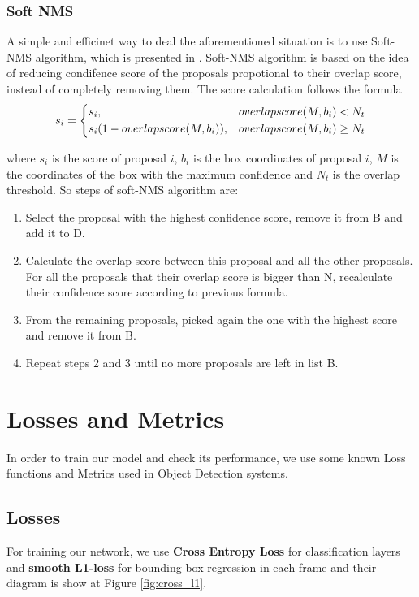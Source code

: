 \subsubsection{Soft NMS}
A simple and efficinet way to deal the aforementioned situation is to use Soft-NMS algorithm, which is presented in \cite{DBLP:journals/corr/BodlaSCD17}.
Soft-NMS algorithm is based on the idea of
reducing condifence score of the proposals propotional to their overlap score, instead of completely removing them.
The score calculation follows the formula 
\[ s_i = \begin{dcases}
    s_i, & overlapscore(M, b_i) < N_t \\
    s_i(1-overlapscore(M, b_i)), & overlapscore(M, b_i) \ge N_t
    \end{dcases}
    \]

    where $s_i$ is the score of proposal $i$, $b_i$ is the box coordinates of proposal $i$, $M$ is the coordinates of
    the box with the maximum confidence and $N_t$ is the overlap threshold. So steps of soft-NMS algorithm are:

\begin{enumerate}
  
\item Select the proposal with the highest confidence score, remove it from B and add it to D.
\item Calculate the overlap score between this proposal and all the other proposals. For all the proposals that their overlap
  score is bigger than N, recalculate their confidence score according to previous formula.
\item From the remaining proposals, picked again the one with the highest score and remove it from B.
\item Repeat steps 2 and 3 until no more proposals are left in list B.
\end{enumerate}
    
    
\section{Losses and Metrics}
In order to train our model and check its performance, we use some known Loss functions and Metrics used in Object Detection systems.
\subsection{Losses}
For training our network, we use \textbf{Cross Entropy Loss} for classification layers and \textbf{smooth L1-loss} for bounding box regression
in each frame and their diagram is show at Figure \ref{fig:cross_l1}.
